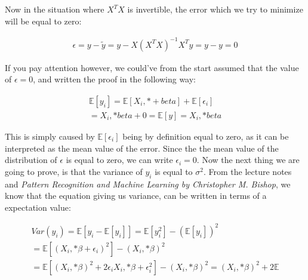 \documentclass[a4paper, 10pt]{article}
\begin{document}
Now in the situation where $X^TX$ is invertible, the error which we try to minimize will be equal to zero: 

\begin{gather*}
	\epsilon = y - \tilde{y} = y - X(X^TX)^{-1}X^Ty = y - y = 0 
\end{gather*}

If you pay attention however, we could've from the start assumed that the value of $\epsilon=0$, and written the proof in the following way: 

\begin{gather*}
	\mathbb{E}[y_i] = \mathbb{E}[X_i,*+beta] + \mathbb{E}[\epsilon_i] \\
						= X_i,*beta + 0 = \mathbb{E}[y] = X_i,*beta
\end{gather*}

This is simply caused by $\mathbb{E}[\epsilon_i]$ being by definition equal to zero, as it can be interpreted as the mean value of the error. Since the the mean value of the distribution of $\epsilon$ is equal to zero, we can write $\epsilon_i=0$. Now the next thing we are going to prove, is that the variance of $y_i$ is equal to $\sigma^2$. From the lecture notes and \emph{Pattern Recognition and Machine Learning by Christopher M. Bishop}, we know that the equation giving us variance, can be written in terms of a expectation value: 

\begin{gather*}
			Var(y_i) = \mathbb{E}[y_i - \mathbb{E}[y_i]] = \mathbb{E}[y_i^2] - (\mathbb{E}[y_i])^2 \\
										= \mathbb{E}[(X_i,*\beta + \epsilon_i)^2] - (X_i,*\beta)^2 \\
										= \mathbb{E}[(X_i,*\beta)^2 + 2\epsilon_iX_i,*\beta + \epsilon_i^2] - (X_i,*\beta)^2
										= (X_i,*\beta)^2 + 2\mathbb{E}
\end{gather*}
\end{document}
